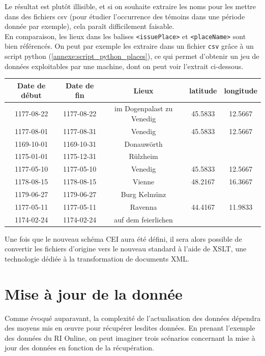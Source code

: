 Le résultat est plutôt illisible, et si on souhaite extraire les noms pour les mettre dans des fichiers csv (pour étudier l'occurrence des témoins dans une période donnée par exemple), cela paraît difficilement faisable.\\
En comparaison, les lieux dans les balises \verb|<issuePlace>| et \verb|<placeName>| sont bien référencés. On peut par exemple les extraire dans un fichier \verb|csv| grâce à un script python (\ref{annexe:script_python_places}), ce qui permet d'obtenir un jeu de données exploitables par une machine, dont on peut voir l'extrait ci-dessous.\\

\begin{tabular}{|c|c|c|c|c|}
\hline
  \textbf{Date de début} & \textbf{Date de fin} & \textbf{Lieux} & \textbf{latitude} & \textbf{longitude}\\ 
  \hline
  1177-08-22 & 1177-08-22	& im Dogenpalast zu Venedig	& 45.5833 & 12.5667\\
  \hline
  1177-08-01 & 1177-08-31 & Venedig & 45.5833	& 12.5667\\
  \hline
  1169-10-01 & 1169-10-31 & Donauwörth & & \\ 		
  \hline
  1175-01-01 & 1175-12-31 & Rülzheim 	&	& \\
  \hline
  1177-05-10 & 1177-05-10 & Venedig & 45.5833 & 12.5667\\
  \hline
  1178-08-15 & 1178-08-15 & Vienne & 48.2167 & 16.3667\\
  \hline
  1179-06-27 & 1179-06-27 & Burg Kelmünz & & \\
  \hline
  1177-05-11 & 1177-05-11 & Ravenna & 44.4167	 & 11.9833\\
  \hline
  1174-02-24 & 1174-02-24 & auf dem feierlichen & & \\
   \hline
\end{tabular}\newline

Une fois que le nouveau schéma CEI aura été défini, il sera alors possible de convertir les fichiers d’origine vers le nouveau standard à l’aide de XSLT, une technologie dédiée à la transformation de documents XML. 


    \section{Mise à jour de la donnée}

Comme évoqué auparavant, la complexité de l’actualisation des données dépendra des moyens mis en œuvre pour récupérer lesdites données. En prenant l'exemple des données du RI Online, on peut imaginer trois scénarios concernant la mise à jour des données en fonction de la récupération. 

